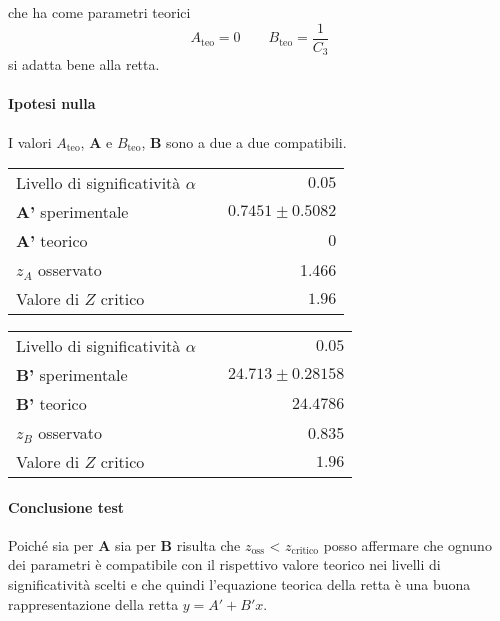 \documentclass{article}
\begin{document}
	che ha come parametri teorici
	\[
	A_\text{teo} = 0 \qquad B_\text{teo} =  \frac{1}{C_3}
	\]
	si adatta bene alla retta. 
	
	\paragraph{Ipotesi nulla} I valori $A_{\text{teo}}$, $\mathbf{A}$ e  $B_{\text{teo}}$, $\mathbf{B}$ sono a due a due compatibili.
	
	\vspace{0.7cm}
	\begin{minipage}{0.5\textwidth}
		\begin{table}[H]
			\centering
			\begin{tabular}{lr} 
				Livello di significatività $\alpha$		&$\quad 0.05$  \\
				\textbf{A'} sperimentale				& $\quad0.7451 \pm 0.5082 $\\
				\textbf{A'} teorico					&  $\quad0$ \\
				$z_{A}$ osservato 					& $\quad$ 1.466 \\
				Valore di $Z$ critico     	& $\quad 1.96$
			\end{tabular}
		\end{table}
	\end{minipage}
	\begin{minipage}{0.5\textwidth}
		\begin{table}[H]
			\centering
			\begin{tabular}{lr} 
				Livello di significatività $\alpha$		&$\quad 0.05$  \\
				\textbf{B'} sperimentale				& $\quad 24.713 \pm  0.28158$	\\
				\textbf{B'} teorico					& $\quad 24.4786$ \\
				$z_{B}$ osservato 					& $\quad$ 0.835 \\
				Valore di $Z$ critico     	& $\quad 1.96$
			\end{tabular}
		\end{table}
	\end{minipage}
	\vspace{0.7cm}
	
	\paragraph{Conclusione test} Poiché sia per $\mathbf{A}$ sia per $\mathbf{B}$ risulta che $z_{\text{oss}}$ < $z_{\text{critico}}$ posso affermare che ognuno dei parametri  è compatibile con il rispettivo valore teorico nei livelli di significatività scelti e che quindi l'equazione teorica della retta è una buona rappresentazione della retta $y=A' + B'x$.\\
	
\end{document}
